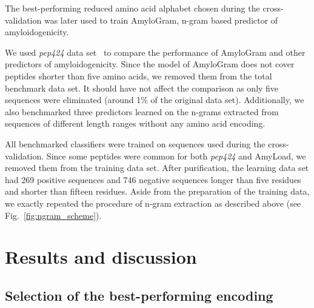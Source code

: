 \documentclass[a4,center,fleqn]{NAR}
\begin{document}
The best-performing reduced amino acid alphabet chosen during the 
cross-validation was later used to train AmyloGram, n-gram based predictor of 
amyloidogenicity.

  We used \textit{pep424} data set~\citep{walsh_pasta_2014} to compare the 
performance of AmyloGram and other predictors of amyloidogenicity. Since the 
model of AmyloGram does not cover peptides shorter than five amino acids, we 
removed them from the total benchmark data set. It should have not affect the 
comparison as only five sequences were eliminated (around 1\% of the original 
data set). Additionally, we also benchmarked three predictors learned on the 
n-grams extracted from sequences of different length ranges without any amino 
acid encoding.

  All benchmarked classifiers were trained on sequences used during the 
cross-validation. Since some peptides were common for both \textit{pep424} and 
AmyLoad, we removed them from the training data set. After purification, the 
learning data set had 269 positive sequences and 746 negative sequences longer 
than five residues and shorter than fifteen residues. Aside from the 
preparation of the training data, we exactly repeated the procedure of n-gram 
extraction as described above (see Fig.~\ref{fig:ngram_scheme}). 


\section{Results and discussion}

\subsection{Selection of the best-performing encoding}
\end{document}
